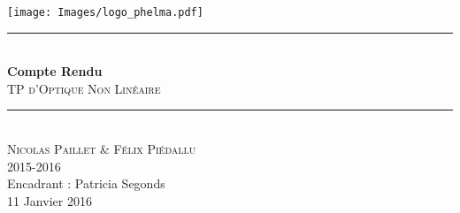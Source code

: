 \begin{titlepage}
    \vspace*{-10px}
    \texttt{[image: Images/logo\_phelma.pdf]}
    \vspace*{-80px}
\begin{flushright}
    \vspace*{60px}
\end{flushright}

\vspace*{0.5cm}
\begin{center}
\rule{\linewidth}{0.5mm}\\[0.4cm]
{\huge{\bfseries Compte Rendu}\\[0.4cm]
\textsc{TP d'Optique Non Linéaire}\\[0.4cm]}
\rule{\linewidth}{0.5mm}\\[0.5cm]

\LARGE{\textsc{Nicolas Paillet \& Félix Piédallu}}\\[0.7cm]
\large{\textsc{2015-2016}}\\[2cm]

\large{Encadrant : Patricia Segonds}\\[1cm]

\large{11 Janvier 2016}\\[2cm]

\end{center}
\end{titlepage}

\tableofcontents        %
\newpage
{}  %
